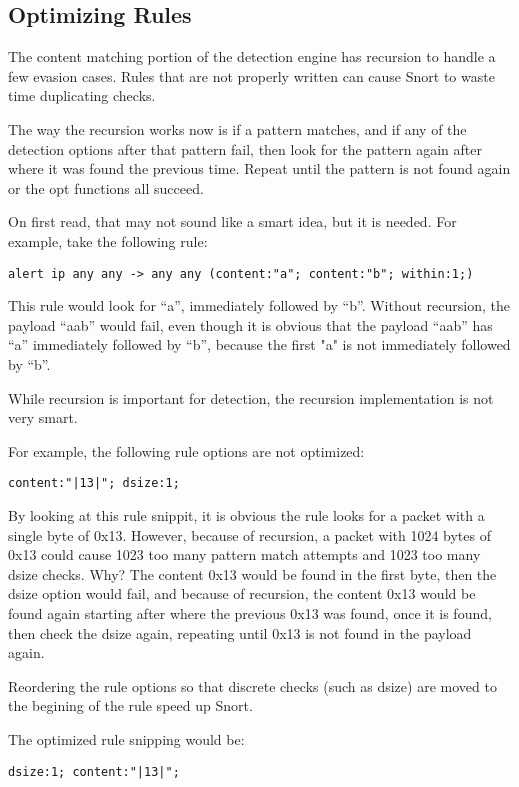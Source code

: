 \documentclass[english]{report}
\begin{document}
\subsection{Optimizing Rules}

The content matching portion of the detection engine has recursion to handle a
few evasion cases.  Rules that are not properly written can cause Snort to
waste time duplicating checks.

The way the recursion works now is if a pattern matches, and if any of the
detection options after that pattern fail, then look for the pattern again
after where it was found the previous time.  Repeat until the pattern is not
found again or the opt functions all succeed.

On first read, that may not sound like a smart idea, but it is needed.  For example, take the following rule:

\begin{verbatim}
alert ip any any -> any any (content:"a"; content:"b"; within:1;)
\end{verbatim}

This rule would look for ``a'', immediately followed by ``b''.  Without recursion,
the payload ``aab'' would fail, even though it is obvious that the payload ``aab''
has ``a'' immediately followed by ``b'', because the first "a" is not
immediately followed by ``b''.

While recursion is important for detection, the recursion implementation is not
very smart.

For example, the following rule options are not optimized:
\begin{verbatim}
content:"|13|"; dsize:1;
\end{verbatim}

By looking at this rule snippit, it is obvious the rule looks for a packet with
a single byte of 0x13.  However, because of recursion, a packet with 1024 bytes
of 0x13 could cause 1023 too many pattern match attempts and 1023 too many
dsize checks.  Why?  The content 0x13 would be found in the first byte, then
the dsize option would fail, and because of recursion, the content 0x13 would
be found again starting after where the previous 0x13 was found, once it is
found, then check the dsize again, repeating until 0x13 is not found in the
payload again.

Reordering the rule options so that discrete checks (such as dsize) are moved to the begining of the rule speed up Snort.  

The optimized rule snipping would be:
\begin{verbatim}
dsize:1; content:"|13|";
\end{verbatim}
\end{document}
